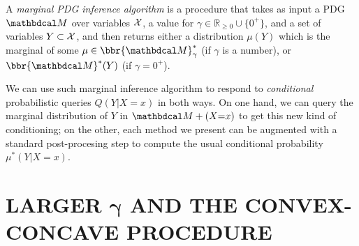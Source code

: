 \documentclass[twoside]{article}
\begin{document}
\begin{defn}
    A \emph{marginal PDG inference algorithm} is a procedure
    that takes as input
    a PDG $\dg M$ over variables $\mathcal X$,
    a value for $\gamma \in \mathbb R_{\ge 0} \cup \{0^+\}$,
    and
    a set of variables $Y \subset \mathcal X$,
    and then returns either a distribution $\mu(Y)$
    which is the
    marginal
    of some $\mu \in \bbr{\dg M}^*_\gamma$  (if $\gamma$ is a number),
    or $\bbr{\dg M}^*(Y)$ (if $\gamma = 0^+$).
\end{defn}

We can use such marginal inference algorithm
to respond to \emph{conditional} probabilistic queries
$Q(Y|X{=}x)$ in both ways.
On one hand, we can query the marginal distribution of $Y$ in $\dg M + (X{=}x)$
to get this new kind of conditioning;
%
on the other,
each method we present can be augmented with a standard post-procesing step
to compute the usual conditional probability $\mu^*(Y|X{=}x)$.



\section{LARGER
    \texorpdfstring{$\boldsymbol\gamma$}{GAMMA} AND THE CONVEX-CONCAVE PROCEDURE}
    \label{sec:larger-gamma}
\end{document}
